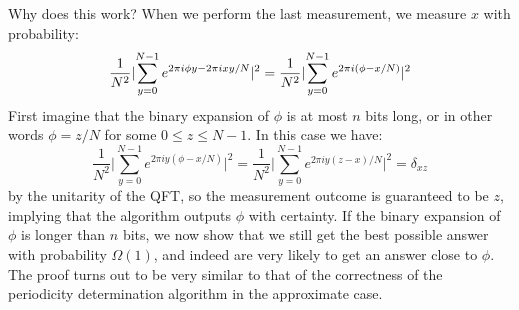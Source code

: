 Why does this work? When we perform the last measurement, we measure $x$ with probability:
\begin{equation}
    \frac{1}{N^2}\lvert \sum_{y=0}^{N-1}e^{2\pi i \phi y - 2\pi i x y/N} \rvert^2 = \frac{1}{N^2}\lvert \sum_{y=0}^{N-1}e^{2\pi i (\phi - x/N)} \rvert^2
\end{equation}
First imagine that the binary expansion of $\phi$ is at most $n$ bits long, or in other words $\phi = z/N$ for some $0 \leq z \leq N - 1$. In this case we have:
\begin{equation}
    \frac{1}{N^2}\lvert \sum_{y=0}^{N-1}e^{2\pi i y(\phi - x/N)}\rvert^2 = \frac{1}{N^2}\lvert \sum_{y=0}^{N-1}e^{2\pi i y(z-x)/N}\rvert^2 = \delta_{xz}
\end{equation}
by the unitarity of the QFT, so the measurement outcome is guaranteed to be $z$, implying that the algorithm outputs $\phi$ with certainty. If the binary expansion of $\phi$ is longer than $n$ bits, we now show that we still get the best possible answer with probability $\Omega(1)$, and indeed are very likely to get an answer close to $\phi$. The proof turns out to be very similar to that of the correctness of the periodicity determination algorithm in the approximate case.

